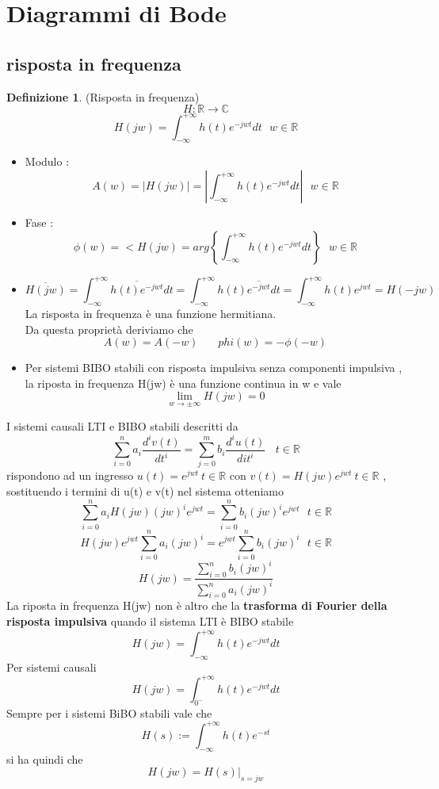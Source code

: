 \documentclass{article}
\theoremstyle{definition}
\newtheorem*{definizione}{Definizione}
\newcommand{\R}{\mathbb{R}}
\newcommand{\intinf}{\int_{-\infty}^{+\infty}}
\newcommand{\sistema}{\sum_{i=0}^{n}a_i \frac{d^i v(t)}{dt^i}=\sum_{j=0}^{m}b_i \frac{d^i u(t)}{dit^i}}
\begin{document}
\newpage
\section{Diagrammi di Bode}
\subsection{risposta in frequenza} 
\begin{definizione}(Risposta in frequenza)
	$$H: \R \to \mathbb{C}$$
	$$H(jw)=\intinf h(t)e^{-jwt}dt \ \ \  w \in \R $$
\end{definizione}
\begin{itemize}
\item Modulo : $$A(w)=|H(jw)|=\left|\intinf h(t)e^{-jwt}dt\right|\ \ \  w \in \R $$
\item Fase : $$\phi(w)=<H(jw)=arg\left\{\intinf h(t)e^{-jwt}dt\right\}\ \ \  w \in \R $$
\item $$\overline{H(jw)}=\intinf \overline{h(t)e^{-jwt}}dt = \intinf h(t)\overline{e^{-jwt}}dt = \intinf h(t)e^{jwt}=H(-jw) \ \ $$ La risposta in frequenza è una funzione hermitiana.\\Da questa proprietà deriviamo che 
$$A(w)=A(-w) \ \ \ \ \ \ \ \ phi(w)=-\phi(-w)$$
\item Per sistemi BIBO stabili con risposta impulsiva senza componenti impulsiva , la riposta in frequenza H(jw) è una funzione continua in w e vale 
$$\lim_{w \rightarrow \pm \infty }H(jw)=0$$
\end{itemize}
I sistemi causali LTI e BIBO stabili descritti da 
$$\sistema \ \ \ \ t \in \R$$ rispondono ad un ingresso $u(t)=e^{jwt} \  t \in \R$ con $v(t)=H(jw)e^{jwt} \ t \in \R$ , sostituendo i termini di u(t) e v(t) nel sistema otteniamo 
$$\sum_{i=0}^{n}a_iH(jw)(jw)^ie^{jwt}=\sum_{i=0}^{n}b_i(jw)^ie^{jwt}\ \ \ t \in \R$$
$$H(jw)e^{jwt}\sum_{i=0}^{n}a_i(jw)^i=e^{jwt}\sum_{i=0}^{n}b_i(jw)^i\ \ \ t \in \R$$ 
$$H(jw)=\frac{\sum_{i=0}^{n}b_i(jw)^i}{\sum_{i=0}^{n}a_i(jw)^i}$$
La riposta in frequenza H(jw) non è altro che la \textbf{trasforma di Fourier della risposta impulsiva} quando il sistema LTI è BIBO stabile
$$H(jw)=\intinf h(t)e^{-jwt}dt$$
Per sistemi causali 
$$H(jw)=\int_{0^-}^{+\infty} h(t)e^{-jwt}dt$$
Sempre per i sistemi BiBO stabili vale che 
$$H(s):=\intinf h(t)e^{-st}$$ si ha quindi che $$H(jw)=H(s)\big|_{s=jw}$$
\end{document}
